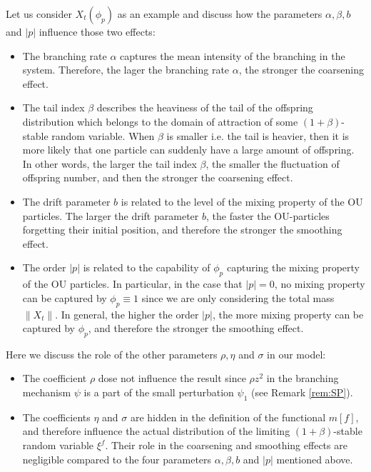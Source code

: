 \documentclass[12pt,a4paper]{amsart}
\theoremstyle{plain}
\theoremstyle{definition}
\numberwithin{equation}{section}
\begin{document}
Let us consider $X_t(\phi_p)$ as an example and discuss how the parameters $\alpha, \beta, b$ and $|p|$
influence those two effects:
\begin{itemize}
\item
  The branching rate $\alpha$ captures the mean intensity of the branching in the system.
  Therefore, the lager the branching rate $\alpha$, the stronger the coarsening effect.
\item
  The tail index $\beta$ describes the heaviness of the tail of the offspring distribution which belongs to the domain of attraction of some $(1+\beta)$-stable random variable.
When $\beta$ is smaller i.e. the tail is heavier, then it is more likely that 
one particle can suddenly have a large amount of offspring.
In other words, the larger the tail index $\beta$, the smaller the fluctuation of offspring number, and then the stronger the coarsening effect.
\item
 The drift parameter $b$ is related to the level of the mixing property of the OU particles.
  The larger the drift parameter $b$, the faster the OU-particles forgetting their initial position, and therefore the stronger the smoothing effect.
\item
    The order $|p|$ is related to the capability of $\phi_p$ capturing the mixing property of the OU particles.
  In particular, in the case that $|p| = 0$, no mixing property can be captured by $\phi_p \equiv 1$ since we are only considering the total mass $\|X_t\|$.
  In general, the higher the order $|p|$, the more mixing property can be captured by $\phi_p$, and therefore the stronger the smoothing effect.
\end{itemize}
Here we discuss the role of the other parameters $\rho, \eta$ and $\sigma$ in our model:
\begin{itemize}
\item
  The coefficient $\rho$ dose not influence the result since $\rho z^2$ in the branching mechanism $\psi$ is a part of the small perturbation $\psi_1$
  (see Remark \ref{rem:SP}).
\item
  The coefficients $\eta$ and $\sigma$ are hidden in the definition of the functional $m[f]$, and therefore influence the actual distribution of the limiting $(1+\beta)$-stable random variable $\xi^f$.
  Their role in the coarsening and smoothing effects are negligible compared to the four parameters $\alpha, \beta, b$ and $|p|$ mentioned above.
\end{itemize}


\end{document}
